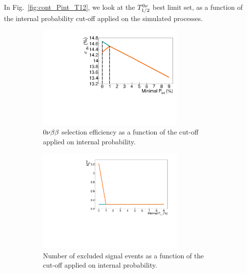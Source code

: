 In Fig.~\ref{fig:cont_Pint_T12}, we look at the $T_{1/2}^{0\nu}$ best limit set, as a function of the internal probability cut-off applied on the simulated processes.
\begin{figure}[!h]
\centering
\begin{subfigure}[t]{0.7\textwidth}
  \centering
  \includegraphics[width=0.8\textwidth]{Sensitivity/fig_sensitivity/cont_cut_eff_B.pdf}
  \captionsetup{justification=centering}
  \caption{$0\nu\beta\beta$ selection efficiency as a function of the cut-off applied on internal probability.
    \label{subfig:cont_Pint_eff}}
\end{subfigure}
\hfill
\begin{subfigure}[t]{0.7\textwidth}
  \centering
  \includegraphics[width=0.8\textwidth]{Sensitivity/fig_sensitivity/cont_cut_Nexp_B.pdf}
  \captionsetup{justification=centering}
  \caption{Number of excluded signal events as a function of the cut-off applied on internal probability.
    \label{subfig:cont_Pint_Nexp}}
\end{subfigure}
\hfill
\begin{subfigure}[t]{0.7\textwidth}
  \centering

\end{subfigure}
\end{figure}
